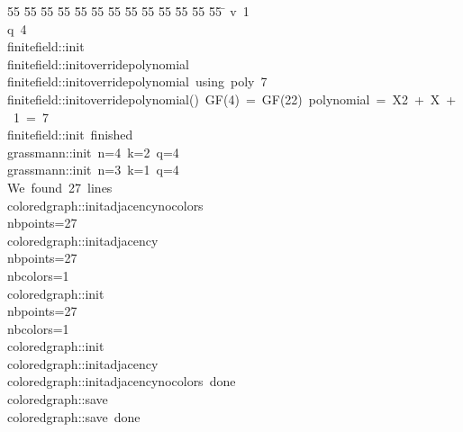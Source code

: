 %
%
\begin{tabbing}
55 \= 55 \= 55 \= 55 \= 55 \= 55 \= 55 \= 55 \= 55 \= 55 \= 55 \= 55 \= 55 \= \kill
{}v\ 1\\[0pt]
q\ 4\\[0pt]
finitefield::init\\[0pt]
finitefield::initoverridepolynomial\\[0pt]
finitefield::initoverridepolynomial\ using\ poly\ 7\\[0pt]
finitefield::initoverridepolynomial()\ GF(4)\ =\ GF(22)\ polynomial\ =\ X2\ +\ X\ +\ 1\ =\ 7\\[0pt]
finitefield::init\ finished\\[0pt]
grassmann::init\ n=4\ k=2\ q=4\\[0pt]
grassmann::init\ n=3\ k=1\ q=4\\[0pt]
We\ found\ 27\ lines\\[0pt]
coloredgraph::initadjacencynocolors\\[0pt]
nbpoints=27\\[0pt]
coloredgraph::initadjacency\\[0pt]
nbpoints=27\\[0pt]
nbcolors=1\\[0pt]
coloredgraph::init\\[0pt]
nbpoints=27\\[0pt]
nbcolors=1\\[0pt]
coloredgraph::init\\[0pt]
coloredgraph::initadjacency\\[0pt]
coloredgraph::initadjacencynocolors\ done\\[0pt]
coloredgraph::save\\[0pt]
coloredgraph::save\ done\\[0pt]
\end{tabbing}
